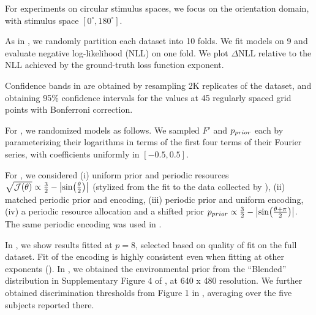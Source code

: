 %
For experiments on circular stimulus spaces, we focus on the orientation domain, with stimulus space $[0^\circ, 180^\circ]$. 


%
As in \cite{hahn2024unifying}, we randomly partition each dataset into 10 folds. We fit models on 9 and evaluate negative log-likelihood (NLL) on one fold. We plot $\Delta$NLL relative to the NLL achieved by the ground-truth loss function exponent.

Confidence bands in  are obtained by resampling 2K replicates of the dataset, and obtaining 95\% confidence intervals for the values at 45 regularly spaced grid points with Bonferroni correction.

%
For , we randomized models as follows.
We sampled $F'$ and $p_{prior}$ each by parameterizing their logarithms in terms of the first four terms of their Fourier series, with coefficients uniformly in $[-0.5, 0.5]$.


%
For , we considered (i) uniform prior and periodic resources $\sqrt{\mathcal{J}(\theta)} \propto \frac{3}{2} - \left|\sin(\frac{\theta}{2})\right|$ (stylized from the fit to the data collected by \cite{deGardelle2010AnOI}), (ii) matched periodic prior and encoding, (iii) periodic prior and uniform encoding, (iv) a periodic resource allocation and a shifted prior $p_{prior} \propto \frac{3}{2} - \left|\sin(\frac{\theta+\pi}{2})\right|$.
The same periodic encoding was used in .




%
In , we show results fitted at $p=8$, selected based on quality of fit on the full dataset.  Fit of the encoding is highly consistent even when fitting at other exponents ().
In , we obtained the environmental prior from the ``Blended'' distribution in Supplementary Figure 4 of \cite{Girshick2011CardinalRV}, at 640 x 480 resolution. We further obtained discrimination thresholds from Figure 1 in \cite{westheimer2003meridional}, averaging over the five subjects reported there.

%

